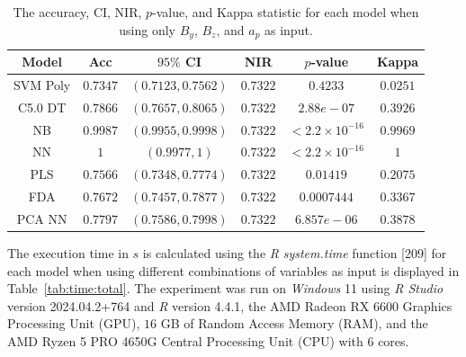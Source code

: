 \documentclass[sn-mathphys-num]{sn-jnl}%
\begin{document}
\begin{table}[!ht]
    \centering
    \caption{The accuracy, CI, NIR, $p$-value, and Kappa statistic for each model when using only $B_{y}$, $B_{z}$, and $a_{p}$ as input.}
	\label{tab:stats:reverse:yzap}
	\begin{tabular}{|c|c|c|c|c|c|}
		\hline
		Model & Acc & $95\%$ CI & NIR & $p$-value & Kappa \\ \hline
		SVM Poly & $0.7347$ & $(0.7123, 0.7562)$ & $0.7322$ & $0.4233$ & $0.0251$ \\ \hline
		C5.0 DT & $0.7866$ & $(0.7657, 0.8065)$ & $0.7322$ & $2.88e-07$ & $0.3926$ \\ \hline
		NB & $0.9987$ & $(0.9955, 0.9998)$ & $0.7322$ & $< 2.2 \times {10}^{-16}$ & $0.9969$ \\ \hline
		NN & $1$ & $(0.9977, 1)$ & $0.7322$ & $< 2.2 \times {10}^{-16}$ & $1$ \\ \hline
		PLS & $0.7566$ & $(0.7348, 0.7774)$ & $0.7322$ & $0.01419$ & $0.2075$ \\ \hline
		FDA & $0.7672$ & $(0.7457, 0.7877)$ & $0.7322$ & $0.0007444$ & $0.3367$ \\ \hline
		PCA NN & $0.7797$ & $(0.7586, 0.7998)$ & $0.7322$ & $6.857e-06$ & $0.3878$ \\ \hline
	\end{tabular}
\end{table}

The execution time in $s$ is calculated using the \textit{R} \textit{system.time} function [209] for each model when using different combinations of variables as input is displayed in Table~\ref{tab:time:total}. The experiment was run on \textit{Windows} 11 using \textit{R Studio} version 2024.04.2+764 and \textit{R} version 4.4.1, the AMD Radeon RX 6600 Graphics Processing Unit (GPU), $16$ GB of Random Access Memory (RAM), and the AMD Ryzen 5 PRO 4650G Central Processing Unit (CPU) with $6$ cores.
\end{document}
